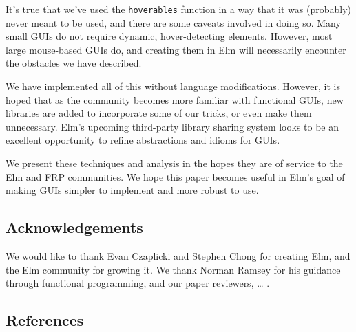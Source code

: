 \documentclass{article}
\begin{document}
It's true that we've used the \texttt{hoverables} function in a way that
it was (probably) never meant to be used, and there are some caveats
involved in doing so. Many small GUIs do not require dynamic,
hover-detecting elements. However, most large mouse-based GUIs do, and
creating them in Elm will necessarily encounter the obstacles we have
described.

We have implemented all of this without language modifications. However,
it is hoped that as the community becomes more familiar with functional
GUIs, new libraries are added to incorporate some of our tricks, or even
make them unnecessary. Elm's upcoming third-party library sharing system
looks to be an excellent opportunity to refine abstractions and idioms
for GUIs.

We present these techniques and analysis in the hopes they are of
service to the Elm and FRP communities. We hope this paper becomes
useful in Elm's goal of making GUIs simpler to implement and more robust
to use.

\subsection{Acknowledgements}\label{acknowledgements}

We would like to thank Evan Czaplicki and Stephen Chong for creating
Elm, and the Elm community for growing it. We thank Norman Ramsey for
his guidance through functional programming, and our paper reviewers,
\ldots{} .

\subsection{References}\label{references}
\end{document}
